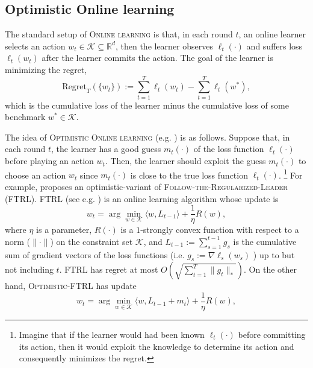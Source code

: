\documentclass[11pt]{article}
\def\K{\mathcal{K}}
\theoremstyle{k}
\begin{document}
\subsection{Optimistic Online learning}
The standard setup of \textsc{Online learning} is that,
in each round $t$, an online learner selects an action $w_{t} \in \K \subseteq \mathbb R^{d}$,
then the learner observes $\ell_{t}(\cdot)$ and suffers loss $\ell_{t}(w_t)$
after the learner commits the action.
The goal of the learner is minimizing the regret,
$$\text{Regret}_{T}( \{ w_t \} ):= \sum_{t=1}^T \ell_{t}(w_t) - \sum_{t=1}^T \ell_{t}(w^*),$$
which is the cumulative loss of the learner minus the cumulative loss of
some benchmark $w^{*} \in \K$.

The idea of \textsc{Optimistic Online learning} (e.g. \cite{CJ12,RS13,SALS15,ALLW18})
is as follows.
Suppose that, in each round $t$, the learner has a good guess $m_t(\cdot)$ of the loss function $\ell_t(\cdot)$ before playing an action $w_t$. 
Then, the learner should exploit the guess $m_t(\cdot)$ to choose an action $w_t$ since $m_t(\cdot)$ is close to the true loss function $\ell_t(\cdot)$.
\footnote{Imagine that if the learner would had been known $\ell_t(\cdot)$ before committing its action, then it would exploit the knowledge to determine its action and consequently minimizes the regret.} For example, \cite{SALS15} proposes an optimistic-variant of \textsc{Follow-the-Regularized-Leader} (\textsc{FTRL}).
\textsc{FTRL} (see e.g. \cite{H14}) is an online learning algorithm whose update is
\begin{equation} \label{optFTRL}
\textstyle w_t  = \arg \min_{w \in \K} \langle w , L_{t-1} \rangle + \frac{1}{\eta} R(w),
\end{equation}
where $\eta$ is a parameter, $R(\cdot)$ is a $1$-strongly convex function with respect to a norm ($\| \cdot \|$) on the constraint set $\K$, and
$L_{t-1}:= \sum_{s=1}^{t-1} g_s$ is the cumulative sum of gradient vectors of 
the loss functions (i.e. $g_s := \nabla \ell_s(w_s)$ ) up to but not including $t$.
FTRL has regret at most $O(\sqrt{\sum_{t=1}^T \| g_t \|_*})$.
On the other hand, \textsc{Optimistic-FTRL} \cite{SALS15} has update  
\begin{equation} \label{optFTRL}
\textstyle w_t  = \arg \min_{w \in \K} \langle w , L_{t-1} + m_t \rangle + \frac{1}{\eta} R(w),
\end{equation}
\end{document}
